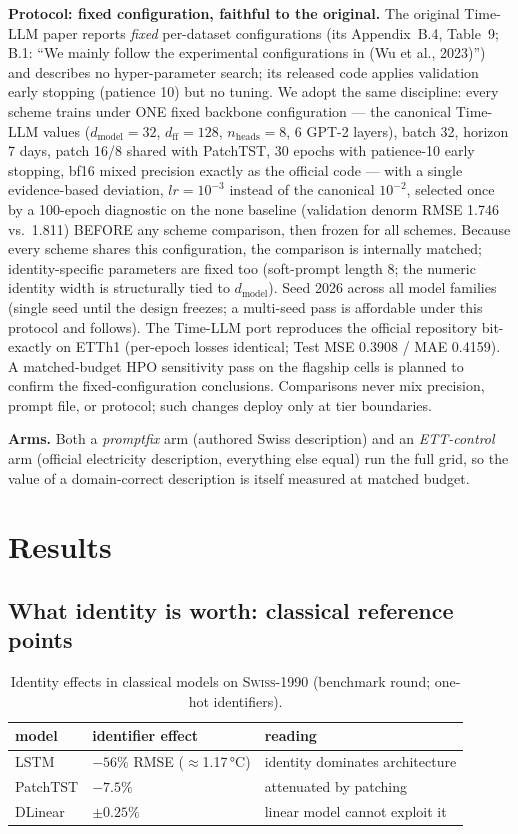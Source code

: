 \documentclass[sigconf,review]{acmart}
\newcommand{\swiss}{\textsc{Swiss-1990}}
\begin{document}
\textbf{Protocol: fixed configuration, faithful to the original.} The original
Time-LLM paper reports \emph{fixed} per-dataset configurations (its
Appendix~B.4, Table~9; B.1: ``We mainly follow the experimental configurations in
(Wu et al., 2023)'') and describes no hyper-parameter search; its released code
applies validation early stopping (patience 10) but no tuning. We adopt the same
discipline: every scheme trains under ONE fixed backbone configuration --- the
canonical Time-LLM values ($d_{\mathrm{model}}{=}32$, $d_{\mathrm{ff}}{=}128$,
$n_{\mathrm{heads}}{=}8$, 6 GPT-2 layers), batch 32, horizon 7 days, patch 16/8
shared with PatchTST, 30 epochs with patience-10 early stopping, bf16 mixed
precision exactly as the official code --- with a single evidence-based
deviation, $lr{=}10^{-3}$ instead of the canonical $10^{-2}$, selected once by a
100-epoch diagnostic on the \textsf{none} baseline (validation denorm RMSE 1.746
vs.\ 1.811) BEFORE any scheme comparison, then frozen for all schemes. Because
every scheme shares this configuration, the comparison is internally matched;
identity-specific parameters are fixed too (soft-prompt length 8; the numeric
identity width is structurally tied to $d_{\mathrm{model}}$). Seed 2026 across
all model families (single seed until the design freezes; a multi-seed pass is
affordable under this protocol and follows). The Time-LLM port reproduces the
official repository bit-exactly on ETTh1 (per-epoch losses identical; Test MSE
0.3908 / MAE 0.4159). A matched-budget HPO sensitivity pass on the flagship cells
is planned to confirm the fixed-configuration conclusions. Comparisons never mix
precision, prompt file, or protocol; such changes deploy only at tier
boundaries.

\textbf{Arms.} Both a \emph{promptfix} arm (authored Swiss description) and an
\emph{ETT-control} arm (official electricity description, everything else equal)
run the full grid, so the value of a domain-correct description is itself measured
at matched budget.

\section{Results}
\label{sec:results}

\subsection{What identity is worth: classical reference points}

\begin{table}[t]
\caption{Identity effects in classical models on \swiss{} (benchmark round;
one-hot identifiers).}
\label{tab:classical}
\begin{tabular}{@{}lll@{}}
\toprule
model & identifier effect & reading \\
\midrule
LSTM & $-56\%$ RMSE ($\approx$1.17\,°C) & identity dominates architecture \\
PatchTST & $-7.5\%$ & attenuated by patching \\
DLinear & $\pm0.25\%$ & linear model cannot exploit it \\
\bottomrule
\end{tabular}
\end{table}
\end{document}
